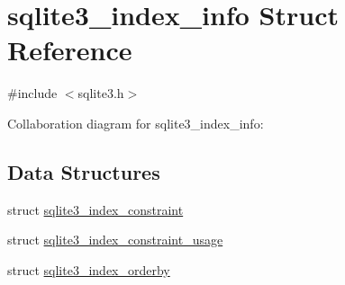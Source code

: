 \hypertarget{structsqlite3__index__info}{}\section{sqlite3\+\_\+index\+\_\+info Struct Reference}
\label{structsqlite3__index__info}


{\ttfamily \#include $<$sqlite3.\+h$>$}



Collaboration diagram for sqlite3\+\_\+index\+\_\+info\+:
\subsection*{Data Structures}
\begin{DoxyCompactItemize}
\item 
struct \hyperlink{structsqlite3__index__info_1_1sqlite3__index__constraint}{sqlite3\+\_\+index\+\_\+constraint}
\item 
struct \hyperlink{structsqlite3__index__info_1_1sqlite3__index__constraint__usage}{sqlite3\+\_\+index\+\_\+constraint\+\_\+usage}
\item 
struct \hyperlink{structsqlite3__index__info_1_1sqlite3__index__orderby}{sqlite3\+\_\+index\+\_\+orderby}
\end{DoxyCompactItemize}
